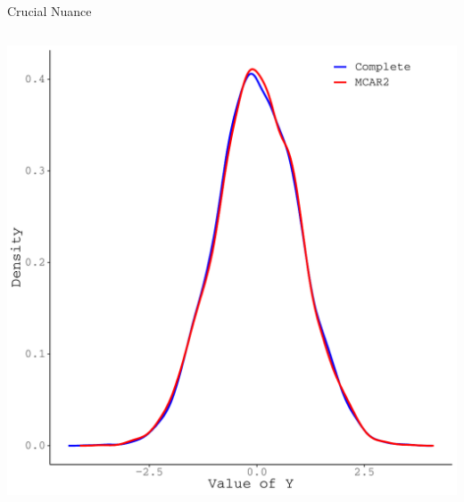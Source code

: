 \documentclass{beamer}\usepackage[]{graphicx}\usepackage[]{color}
\newenvironment{knitrout}{}{} %
\begin{document}
\begin{frame}{Crucial Nuance}
\begin{columns}
\begin{column}{0.5\textwidth}
\begin{knitrout}
{\centering \includegraphics[width=1\linewidth]{figure/intro-unnamed-chunk-19-1} 

}


\end{knitrout}
  
\end{column}
\end{columns}

\end{frame}

\watermarkon %
\end{document}

